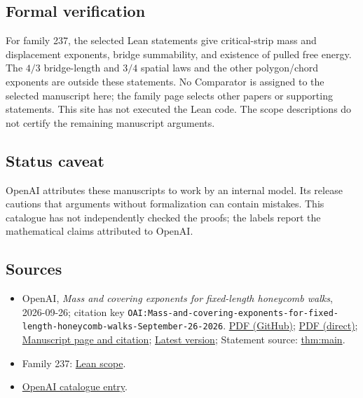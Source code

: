 \documentclass[11pt]{article}
\begin{document}
\subsection{Formal verification}
For family 237, the selected Lean statements give critical-strip mass and displacement exponents, bridge summability, and existence of pulled free energy. The $4/3$ bridge-length and $3/4$ spatial laws and the other polygon/chord exponents are outside these statements. No Comparator is assigned to the selected manuscript here; the family page selects other papers or supporting statements. This site has not executed the Lean code. The scope descriptions do not certify the remaining manuscript arguments.

\subsection{Status caveat}
OpenAI attributes these manuscripts to work by an internal model. Its release cautions that arguments without formalization can contain mistakes. This catalogue has not independently checked the proofs; the labels report the mathematical claims attributed to OpenAI.

\subsection{Sources}
\begin{itemize}
\item OpenAI, \emph{Mass and covering exponents for fixed-length honeycomb walks}, 2026-09-26; citation key \texttt{OAI:Mass-and-covering-exponents-for-fixed-length-honeycomb-walks-September-26-2026}. \href{https://github.com/openai/math/blob/adc7f1241b42e322a6451854ab7e4b4c146bf78a/preprints/Mass-and-covering-exponents-for-fixed-length-honeycomb-walks-September-26-2026/main.pdf}{PDF (GitHub)}; \href{https://github.com/openai/math/raw/adc7f1241b42e322a6451854ab7e4b4c146bf78a/preprints/Mass-and-covering-exponents-for-fixed-length-honeycomb-walks-September-26-2026/main.pdf}{PDF (direct)}; \href{https://github.com/openai/math/blob/adc7f1241b42e322a6451854ab7e4b4c146bf78a/preprints/Mass-and-covering-exponents-for-fixed-length-honeycomb-walks-September-26-2026/README.md}{Manuscript page and citation}; \href{https://github.com/openai/math/blob/main/preprints/Mass-and-covering-exponents-for-fixed-length-honeycomb-walks-September-26-2026/main.pdf}{Latest version}; Statement source: \href{https://github.com/openai/math/blob/adc7f1241b42e322a6451854ab7e4b4c146bf78a/preprints/Mass-and-covering-exponents-for-fixed-length-honeycomb-walks-September-26-2026/build/sections/00\_introduction.tex\#L17}{thm:main}.
\item Family 237: \href{https://github.com/openai/math/blob/adc7f1241b42e322a6451854ab7e4b4c146bf78a/lean/docs/237.md}{Lean scope}.
\item \href{https://github.com/openai/math/blob/adc7f1241b42e322a6451854ab7e4b4c146bf78a/CONTENTS.md}{OpenAI catalogue entry}.
\end{itemize}
\end{document}
